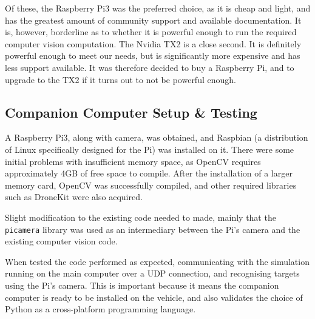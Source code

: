\documentclass[11pt,twoside]{article}
\begin{document}
Of these, the Raspberry Pi3 was the preferred choice, as it is cheap and light, and has the greatest amount of community support and available documentation. It is, however, borderline as to whether it is powerful enough to run the required computer vision computation\cite{companion_computer_power}. The Nvidia TX2 is a close second. It is definitely powerful enough to meet our needs, but is significantly more expensive and has less support available. It was therefore decided to buy a Raspberry Pi, and to upgrade to the TX2 if it turns out to not be powerful enough.


\subsection{Companion Computer Setup \& Testing}
A Raspberry Pi3, along with camera, was obtained, and Raspbian (a distribution of Linux specifically designed for the Pi) was installed on it. There were some initial problems with insufficient memory space, as OpenCV requires approximately 4GB of free space to compile. After the installation of a larger memory card, OpenCV was successfully compiled, and other required libraries such as DroneKit were also acquired.

Slight modification to the existing code needed to made, mainly that the \lstinline|picamera| library was used as an intermediary between the Pi's camera and the existing computer vision code.

When tested the code performed as expected, communicating with the simulation running on the main computer over a UDP connection, and recognising targets using the Pi's camera. This is important because it means the companion computer is ready to be installed on the vehicle, and also validates the choice of Python as a cross-platform programming language.
\end{document}
